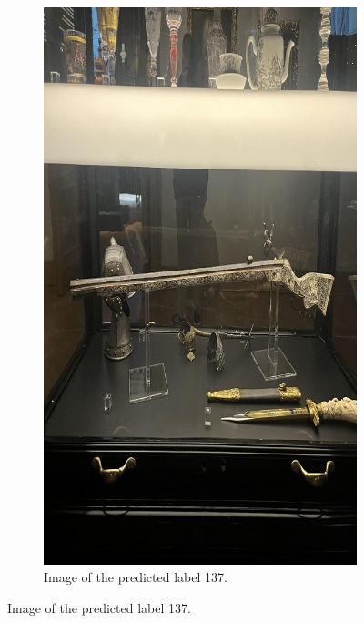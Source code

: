 \begin{figure}[h]
\begin{subfigure}[b]{0.4\textwidth}
        \includegraphics[width=\textwidth]{img/137.jpg}
        \caption{Image of the predicted label 137.}
    \end{subfigure}

    \vspace{1em}


\end{figure}
